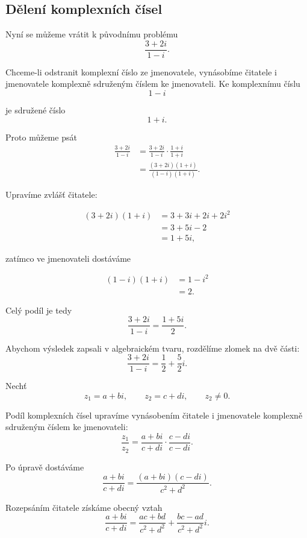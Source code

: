 \documentclass[12pt,a4paper]{article}
\begin{document}
\subsection{Dělení komplexních čísel}
Nyní se můžeme vrátit k původnímu problému
\[
    \frac{3+2i}{1-i}.
\]

Chceme-li odstranit komplexní číslo ze jmenovatele, 
vynásobíme čitatele i jmenovatele komplexně sdruženým číslem ke jmenovateli.
Ke komplexnímu číslu
\[
    1-i
\]

je sdružené číslo
\[
    1+i.
\]

Proto můžeme psát
\begin{align*}
    \frac{3+2i}{1-i}    &= \frac{3+2i}{1-i}\cdot\frac{1+i}{1+i}\\
                        &= \frac{(3+2i)(1+i)}{(1-i)(1+i)}.
\end{align*}

Upravíme zvlášť čitatele:

\begin{align*}
    (3+2i)(1+i)     &= 3+3i+2i+2i^2\\
                    &= 3+5i-2\\
                    &= 1+5i,
\end{align*}

zatímco ve jmenovateli dostáváme

\begin{align*}
    (1-i)(1+i)  &=1-i^2\\
                &=2.
\end{align*}

Celý podíl je tedy
\[
    \frac{3+2i}{1-i} = \frac{1+5i}{2}.
\]

Abychom výsledek zapsali v algebraickém tvaru, rozdělíme zlomek na dvě části:
\[
    \frac{3+2i}{1-i} = \frac{1}{2}+\frac{5}{2}i.
\]


\begin{definitionbox}
    Nechť
    \[
        z_1=a+bi, \qquad z_2=c+di, \qquad z_2\neq0.
    \]

    Podíl komplexních čísel upravíme vynásobením čitatele i jmenovatele komplexně
    sdruženým číslem ke jmenovateli:
    \[
        \frac{z_1}{z_2} = \frac{a+bi}{c+di}\cdot\frac{c-di}{c-di}.
    \]

    Po úpravě dostáváme
    \[
        \frac{a+bi}{c+di} = \frac{(a+bi)(c-di)}{c^2+d^2}.
    \]

    Rozepsáním čitatele získáme obecný vztah
    \[
        \frac{a+bi}{c+di} = \frac{ac+bd}{c^2+d^2}+\frac{bc-ad}{c^2+d^2}i.
    \]
\end{definitionbox}
\end{document}
